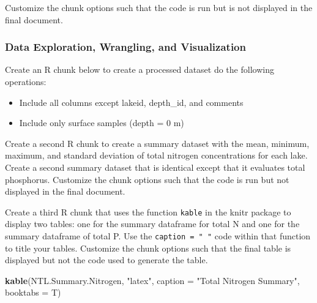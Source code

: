 \documentclass[]{article}
\newenvironment{Shaded}{\begin{snugshade}}{\end{snugshade}}
\newcommand{\KeywordTok}[1]{\textcolor[rgb]{0.13,0.29,0.53}{\textbf{#1}}}
\newcommand{\DataTypeTok}[1]{\textcolor[rgb]{0.13,0.29,0.53}{#1}}
\newcommand{\DecValTok}[1]{\textcolor[rgb]{0.00,0.00,0.81}{#1}}
\newcommand{\StringTok}[1]{\textcolor[rgb]{0.31,0.60,0.02}{#1}}
\newcommand{\OperatorTok}[1]{\textcolor[rgb]{0.81,0.36,0.00}{\textbf{#1}}}
\newcommand{\NormalTok}[1]{#1}
\providecommand{\tightlist}{%
  \setlength{\itemsep}{0pt}\setlength{\parskip}{0pt}}
\begin{document}
Customize the chunk options such that the code is run but is not
displayed in the final document.

\subsubsection{Data Exploration, Wrangling, and
Visualization}\label{data-exploration-wrangling-and-visualization}

Create an R chunk below to create a processed dataset do the following
operations:

\begin{itemize}
\tightlist
\item
  Include all columns except lakeid, depth\_id, and comments
\item
  Include only surface samples (depth = 0 m)
\end{itemize}

\begin{Shaded}
\end{Shaded}

Create a second R chunk to create a summary dataset with the mean,
minimum, maximum, and standard deviation of total nitrogen
concentrations for each lake. Create a second summary dataset that is
identical except that it evaluates total phosphorus. Customize the chunk
options such that the code is run but not displayed in the final
document.

Create a third R chunk that uses the function \texttt{kable} in the
knitr package to display two tables: one for the summary dataframe for
total N and one for the summary dataframe of total P. Use the
\texttt{caption\ =\ "\ "} code within that function to title your
tables. Customize the chunk options such that the final table is
displayed but not the code used to generate the table.

\begin{Shaded}
\begin{Highlighting}[]
\KeywordTok{kable}\NormalTok{(NTL.Summary.Nitrogen, }\StringTok{"latex"}\NormalTok{, }\DataTypeTok{caption =} \StringTok{"Total Nitrogen Summary"}\NormalTok{, }\DataTypeTok{booktabs =}\NormalTok{ T) }
\end{Highlighting}
\end{Shaded}
\end{document}
